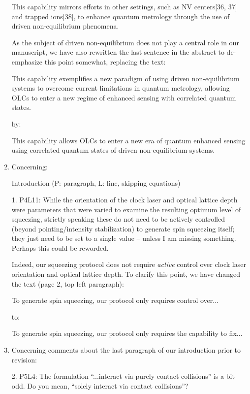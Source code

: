 \documentclass[preprint,superscriptaddress]{revtex4-2}
\newcommand{\blue}[1]{{\color{blue} #1}}
\newcommand{\red}[1]{{\color{red} #1}}
\newcommand{\green}[1]{{\color{ForestGreen} #1}}
\begin{document}
\begin{enumerate}
  \green{This capability mirrors efforts in other settings, such as NV
    centers[36, 37] and trapped ions[38], to enhance quantum metrology
    through the use of driven non-equilibrium phenomena.}

  As the subject of driven non-equilibrium does not play a central
  role in our manuscript, we have also rewritten the last sentence in
  the abstract to de-emphasize this point somewhat, replacing the
  text:

  \red{This capability exemplifies a new paradigm of using driven
    non-equilibrium systems to overcome current limitations in quantum
    metrology, allowing OLCs to enter a new regime of enhanced sensing
    with correlated quantum states.}

  by:

  \green{This capability allows OLCs to enter a new era of quantum
    enhanced sensing using correlated quantum states of driven
    non-equilibrium systems.}

\item Concerning:

  \blue{Introduction (P: paragraph, L: line, skipping equations)}

  \blue{1. P4L11: While the orientation of the clock laser and optical
    lattice depth were parameters that were varied to examine the
    resulting optimum level of squeezing, strictly speaking these do
    not need to be actively controlled (beyond pointing/intensity
    stabilization) to generate spin squeezing itself; they just need
    to be set to a single value -- unless I am missing
    something. Perhaps this could be reworded.}

  Indeed, our squeezing protocol does not require {\it active} control
  over clock laser orientation and optical lattice depth.  To clarify
  this point, we have changed the text (page 2, top left paragraph):

  \red{To generate spin squeezing, our protocol only requires control
    over...}

  to:

  \green{To generate spin squeezing, our protocol only requires the
    capability to fix...}

\item Concerning comments about the last paragraph of our introduction
  prior to revision:

  \blue{2. P5L4: The formulation ``...interact via purely contact
    collisions'' is a bit odd. Do you mean, ``solely interact via
    contact collisions''?}


\end{enumerate}
\end{document}
